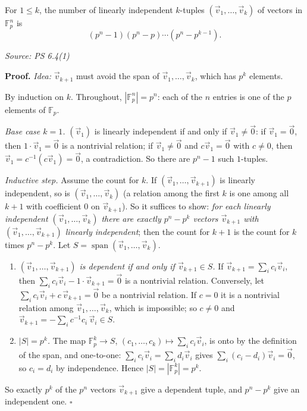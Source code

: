 \documentclass[11pt]{report}
\renewenvironment{proof}[1][Proof]{\noindent\textbf{#1.} }{\hfill$\square$\par\vspace{5pt}}
\newcommand{\srcline}[1]{\par\hfill{\footnotesize\textit{Source: #1}}}
\begin{document}
\begin{lembox}\label{lem:count-independent-tuples}
For $1 \leq k$, the number of linearly independent $k$-tuples $(\vec v_1, \ldots, \vec v_k)$ of vectors in $\mathbb{F}_p^n$ is
\[ (p^n - 1)(p^n - p) \cdots (p^n - p^{k-1}) . \]
\srcline{PS 6.4(1)}
\end{lembox}

\begin{proof}
\textit{Idea:} $\vec v_{k+1}$ must avoid the span of $\vec v_1, \ldots, \vec v_k$, which has $p^k$ elements.\par
By induction on $k$. Throughout, $|\mathbb{F}_p^n| = p^n$: each of the $n$ entries is one of the $p$ elements of $\mathbb{F}_p$.

\emph{Base case $k = 1$.} $(\vec v_1)$ is linearly independent if and only if $\vec v_1 \neq \vec 0$: if $\vec v_1 = \vec 0$, then $1 \cdot \vec v_1 = \vec 0$ is a nontrivial relation; if $\vec v_1 \neq \vec 0$ and $c\vec v_1 = \vec 0$ with $c \neq 0$, then $\vec v_1 = c^{-1}(c\vec v_1) = \vec 0$, a contradiction. So there are $p^n - 1$ such $1$-tuples.

\emph{Inductive step.} Assume the count for $k$. If $(\vec v_1, \ldots, \vec v_{k+1})$ is linearly independent, so is $(\vec v_1, \ldots, \vec v_k)$ (a relation among the first $k$ is one among all $k+1$ with coefficient $0$ on $\vec v_{k+1}$). So it suffices to show: \emph{for each linearly independent $(\vec v_1, \ldots, \vec v_k)$ there are exactly $p^n - p^k$ vectors $\vec v_{k+1}$ with $(\vec v_1, \ldots, \vec v_{k+1})$ linearly independent}; then the count for $k+1$ is the count for $k$ times $p^n - p^k$. Let $S = \operatorname{span}(\vec v_1, \ldots, \vec v_k)$.
\begin{enumerate}
    \item \emph{$(\vec v_1, \ldots, \vec v_{k+1})$ is dependent if and only if $\vec v_{k+1} \in S$.} If $\vec v_{k+1} = \sum_i c_i\vec v_i$, then $\sum_i c_i \vec v_i - 1\cdot\vec v_{k+1} = \vec 0$ is a nontrivial relation. Conversely, let $\sum_i c_i\vec v_i + c\,\vec v_{k+1} = \vec 0$ be a nontrivial relation. If $c = 0$ it is a nontrivial relation among $\vec v_1, \ldots, \vec v_k$, which is impossible; so $c \neq 0$ and $\vec v_{k+1} = -\sum_i c^{-1}c_i\,\vec v_i \in S$.
    \item \emph{$|S| = p^k$.} The map $\mathbb{F}_p^k \to S$, $(c_1, \ldots, c_k) \mapsto \sum_i c_i\vec v_i$, is onto by the definition of the span, and one-to-one: $\sum_i c_i\vec v_i = \sum_i d_i\vec v_i$ gives $\sum_i (c_i - d_i)\vec v_i = \vec 0$, so $c_i = d_i$ by independence. Hence $|S| = |\mathbb{F}_p^k| = p^k$.
\end{enumerate}
So exactly $p^k$ of the $p^n$ vectors $\vec v_{k+1}$ give a dependent tuple, and $p^n - p^k$ give an independent one.
\end{proof}
\end{document}
